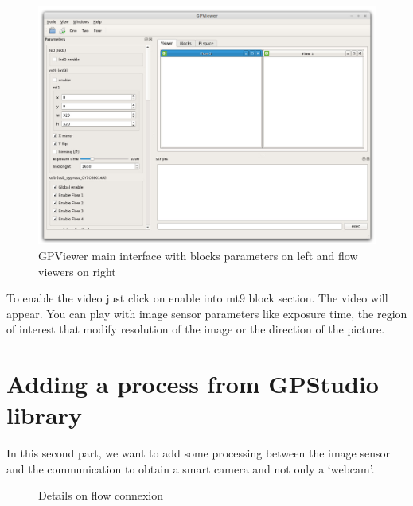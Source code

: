 \documentclass[10pt,a4paper]{article}
\begin{document}
\begin{figure}[h!]
\centering
\includegraphics[scale=0.35]{gpviewer_mainwindows.jpg}
\caption{GPViewer main interface with blocks parameters on left and flow viewers on right}
\end{figure}

To enable the video just click on enable into mt9 block section. The video will appear.
 You can play with image sensor parameters like exposure time, the region of interest that modify resolution of the image or the direction of the picture.

\newpage
\section{Adding a process from GPStudio library}
In this second part, we want to add some processing between the image sensor and the communication to obtain a smart camera and not only a `webcam'.

\begin{figure}[h!]
\centering
{}
\caption{Details on flow connexion}
\end{figure}
\end{document}
